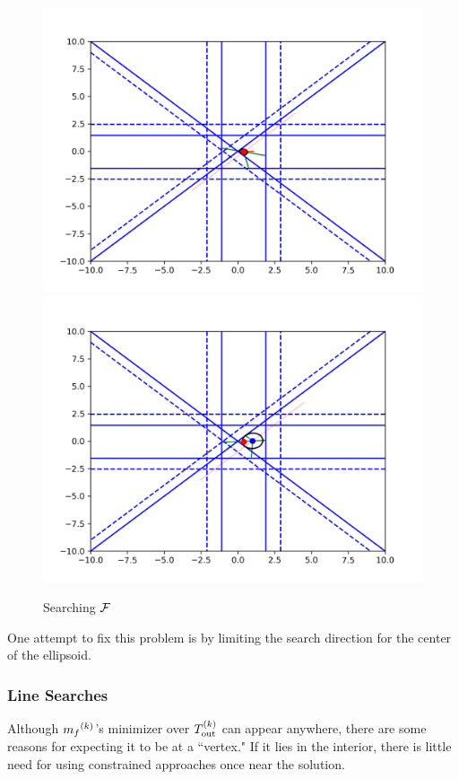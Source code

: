 \begin{figure}[ht]
    \centering
    \includegraphics[scale=0.4]{images/everything_runs_1.png}
    \includegraphics[scale=0.4]{images/everything_runs_2.png}
    \caption{Searching ${\mathcal F}$}
    \label{ellipse_runs_away}
\end{figure}


One attempt to fix this problem is by limiting the search direction for the center of the ellipsoid.


\subsubsection{Line Searches}
Although ${{m}_f}^{(k)}$'s minimizer over ${T_{\text{out}}^{(k)}}$  can appear anywhere, there are some reasons for expecting it to be at a ``vertex."
If it lies in the interior, there is little need for using constrained approaches once near the solution.


